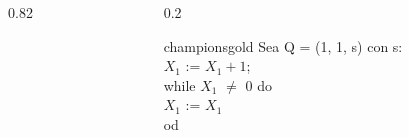 \documentclass[xcolor=table]{beamer}
\begin{document}
\begin{frame}[fragile]
\begin{columns}
\begin{column}{0.82\textwidth}
\begin{itemize}
    \end{itemize}
      
    \end{column}


    \begin{column}{0.2\textwidth}
        \begin{colorblock}[black]{championsgold}{}\scriptsize
        Sea Q = (1, 1, s) con s: \\
        \hspace{0.5cm}   $X_1$ := $X_1 + 1$;\\
        \hspace{0.5cm}   while $X_1$ $\neq$ 0 do \\
        \hspace{0.75cm}    $X_1$ := $X_1$\\
        \hspace{0.5cm}  od
        \end{colorblock}
    \end{column}
    
\end{columns}
        
\end{frame}
\end{document}
